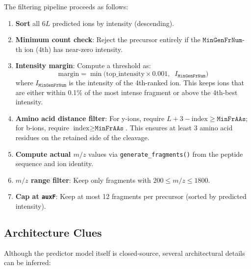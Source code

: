 \documentclass[11pt,a4paper]{article}
\begin{document}
The filtering pipeline proceeds as follows:

\begin{enumerate}
    \item \textbf{Sort} all $6L$ predicted ions by intensity (descending).
    \item \textbf{Minimum count check}: Reject the precursor entirely if the $\texttt{MinGenFrNum}$-th ion (4th) has near-zero intensity.
    \item \textbf{Intensity margin}: Compute a threshold as:
    \begin{equation}
        \text{margin} = \min\!\Big(\text{top\_intensity} \times 0.001,\;\; I_{\texttt{MinGenFrNum}}\Big)
    \end{equation}
    where $I_{\texttt{MinGenFrNum}}$ is the intensity of the 4th-ranked ion. This keeps ions that are either within 0.1\% of the most intense fragment or above the 4th-best intensity.
    \item \textbf{Amino acid distance filter}: For y-ions, require $L + 3 - \text{index} \geq \texttt{MinFrAAs}$; for b-ions, require $\text{index} \geq \texttt{MinFrAAs}$. This ensures at least 3 amino acid residues on the retained side of the cleavage.
    \item \textbf{Compute actual $m/z$} values via \texttt{generate\_fragments()} from the peptide sequence and ion identity.
    \item \textbf{$m/z$ range filter}: Keep only fragments with $200 \leq m/z \leq 1800$.
    \item \textbf{Cap at \texttt{auxF}}: Keep at most 12 fragments per precursor (sorted by predicted intensity).
\end{enumerate}

\subsection{Architecture Clues}

Although the predictor model itself is closed-source, several architectural details can be inferred:
\end{document}
